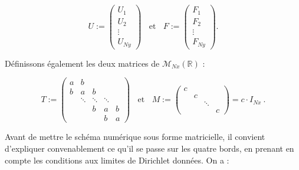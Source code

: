 \documentclass[11pt]{article}
\def \RR {\mathbb{R}}
\def \sM {\mathcal{M}}
\begin{document}
$$U := \begin{pmatrix}
	U_1 \\
	U_2 \\
	\vdots \\
	U_{Ny}
\end{pmatrix}~~~~\text{et}~~~~F := \begin{pmatrix}
	F_1 \\
	F_2 \\
	\vdots \\
	F_{Ny}
\end{pmatrix}.$$

\vspace{5 mm}

\newpage

\noindent
Définissons également les deux matrices de $\sM_{Nx}(\RR)$ :

$$T := \begin{pmatrix}
		a & b & ~ & ~ & ~ \\
		b & a & b & ~ & ~ \\
		~ & \ddots & \ddots & \ddots &  ~ \\
		~ & ~ & b & a & b \\
		~ & ~ & ~ & b & a
	\end{pmatrix}~~~~\text{et}~~~~M := \begin{pmatrix}
		c & ~ & ~ & ~ \\
		~ & c & ~ & ~ \\
		~ & ~ & \ddots & ~ \\
		~ & ~ & ~ & c
	\end{pmatrix} = c \cdot I_{Nx}~.$$

\vspace{5 mm}

\noindent
Avant de mettre le schéma numérique sous forme matricielle, il convient d'expliquer convenablement ce qu'il se passe sur les quatre bords, en prenant en compte les conditions aux limites de Dirichlet données. On a :

\vspace{5 mm}
\end{document}
